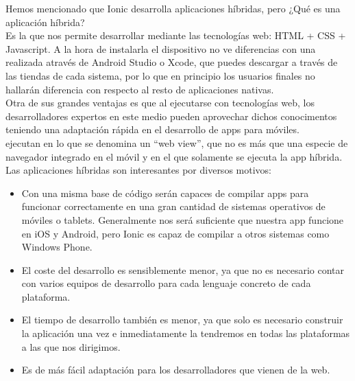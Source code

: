 \documentclass[a4paper, 11pt]{article}
\begin{document}
\begin{itemize}
            Hemos mencionado que Ionic desarrolla aplicaciones híbridas, pero ¿Qué
            es una aplicación híbrida?\\

            Es la que nos permite desarrollar mediante las tecnologías web: HTML +
            CSS + Javascript. A la hora de instalarla el dispositivo no ve
            diferencias con una realizada através de Android Studio o Xcode, que
            puedes descargar a través de las tiendas de cada sistema, por lo que en
            principio los usuarios finales no hallarán diferencia con respecto al
            resto de aplicaciones nativas.\\

            Otra de sus grandes ventajas es que al ejecutarse con tecnologías web,
            los desarrolladores expertos en este medio pueden aprovechar dichos
            conocimentos teniendo una adaptación rápida en el desarrollo de apps
            para móviles.\\

            ejecutan en lo que se denomina un “web view”, que no es más que una
            especie de navegador integrado en el móvil y en el que solamente se
            ejecuta la app híbrida.\\

            Las aplicaciones híbridas son interesantes por diversos motivos:
            \begin{itemize}
                \item{Con una misma base de código serán capaces de compilar apps
                para funcionar correctamente en una gran cantidad de sistemas
                operativos de móviles o tablets. Generalmente nos será suficiente
                que nuestra app funcione en iOS y Android, pero Ionic es capaz de
                compilar a otros sistemas como Windows Phone.}
                \item{El coste del desarrollo es sensiblemente menor, ya que no es
                necesario contar con varios equipos de desarrollo para cada lenguaje
                concreto de cada plataforma.}
                \item{El tiempo de desarrollo también es menor, ya que solo es
                necesario construir la aplicación una vez e inmediatamente la
                tendremos en todas las plataformas a las que nos dirigimos.}
                \item {Es de más fácil adaptación para los desarrolladores que
                vienen de la web.}
            \end{itemize}


\end{itemize}
\end{document}
